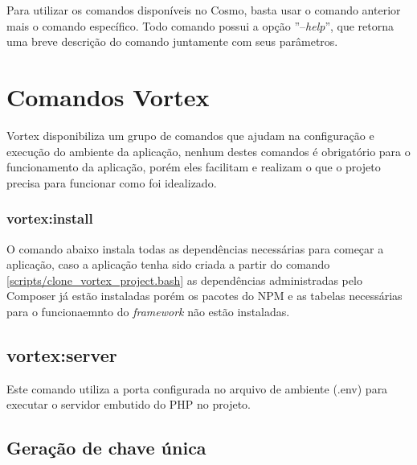 \spaceH{}

\label{scripts/cosmo_commands_list.bash}

Para utilizar os comandos disponíveis no Cosmo, basta usar o comando anterior mais o comando específico. Todo comando possui a opção ''--\textit{help}'', que retorna uma breve descrição do comando juntamente com seus parâmetros.

\spaceH{}

\label{scripts/cosmo_help_commands.bash}

\section{Comandos Vortex}
Vortex disponibiliza um grupo de comandos que ajudam na configuração e execução do ambiente da aplicação, nenhum destes comandos é obrigatório para o funcionamento da aplicação, porém eles facilitam e realizam o que o projeto precisa para funcionar como foi idealizado.

\subsubsection{vortex:install}
O comando abaixo instala todas as dependências necessárias para começar a aplicação, caso a aplicação tenha sido criada a partir do comando \ref{scripts/clone_vortex_project.bash} as dependências administradas pelo Composer já estão instaladas porém os pacotes do NPM e as tabelas necessárias para o funcionaemnto do \textit{framework} não estão instaladas.

\spaceH{}

\label{scripts/cosmo_vortex_install.bash}

\subsection{vortex:server}

Este comando utiliza a porta configurada no arquivo de ambiente (.env) para executar o servidor embutido do PHP no projeto.

\spaceH{}

\label{scripts/cosmo_vortex_server.bash}

\subsection{Geração de chave única}

